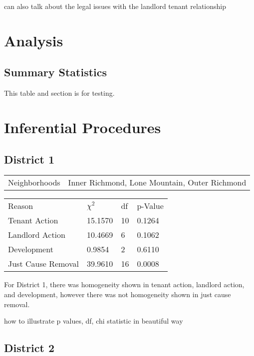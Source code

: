 \documentclass[]{article}
\begin{document}
can also talk about the legal issues with the landlord tenant relationship
\section{Analysis}
\subsection{Summary Statistics}
This table and section is for testing.

\section{Inferential Procedures}
\subsection{District 1}

\begin{table}[h]
\centering
\begin{tabular}{l | l}
Neighborhoods & Inner Richmond, Lone Mountain, Outer Richmond \\
\end{tabular}
\end{table}
\FloatBarrier

\begin {table}[h]
\centering
\begin{tabular}{l | l | l | l}
	
	Reason	&  $\chi ^{2}$ & df & p-Value \\
	Tenant Action 		   &  15.1570  & 10  & 0.1264  \\
	Landlord Action	       &  10.4669  & 6   & 0.1062 \\
	Development			   &  0.9854   & 2   & 0.6110 \\
	Just Cause Removal	   &  39.9610  & 16  & 0.0008 \\
\end{tabular} \newline
\end{table}
\FloatBarrier

For District 1, there was homogeneity shown in tenant action, landlord action, and development, however there was not homogeneity shown in just cause removal. 

how to illustrate p values, df, chi statistic in beautiful way

\subsection{District 2}
\end{document}
